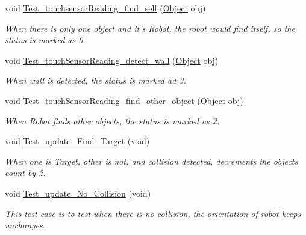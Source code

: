 \begin{DoxyCompactItemize}
void \hyperlink{classEnvironmentClassTest_ab33d3a63cd4f5b8669788f50d37fb2ce}{Test\-\_\-touchsensor\-Reading\-\_\-find\-\_\-self} (\hyperlink{classObject}{Object} obj)
\begin{DoxyCompactList}\small\item\em When there is only one object and it's Robot, the robot would find itself, so the status is marked as 0. \end{DoxyCompactList}\item 
void \hyperlink{classEnvironmentClassTest_a7efc73377aef53781c7130fd80088c5d}{Test\-\_\-touch\-Sensor\-Reading\-\_\-detect\-\_\-wall} (\hyperlink{classObject}{Object} obj)
\begin{DoxyCompactList}\small\item\em When wall is detected, the status is marked ad 3. \end{DoxyCompactList}\item 
void \hyperlink{classEnvironmentClassTest_a43fff8a75f5a49a83b987ad96aa13897}{Test\-\_\-touch\-Sensor\-Reading\-\_\-find\-\_\-other\-\_\-object} (\hyperlink{classObject}{Object} obj)
\begin{DoxyCompactList}\small\item\em When Robot finds other objects, the status is marked as 2. \end{DoxyCompactList}\item 
void \hyperlink{classEnvironmentClassTest_adc618d79e098a26b928925ce11609e6f}{Test\-\_\-update\-\_\-\-Find\-\_\-\-Target} (void)
\begin{DoxyCompactList}\small\item\em When one is Target, other is not, and collision detected, decrements the objects count by 2. \end{DoxyCompactList}\item 
void \hyperlink{classEnvironmentClassTest_a32e8d69d217c911bc60e56f512be4e04}{Test\-\_\-update\-\_\-\-No\-\_\-\-Collision} (void)
\begin{DoxyCompactList}\small\item\em This test case is to test when there is no collision, the orientation of robot keeps unchanges. \end{DoxyCompactList}\end{DoxyCompactItemize}


